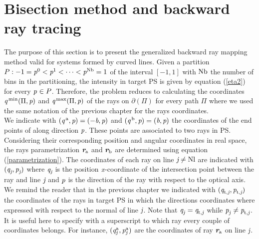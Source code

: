 \section{Bisection method and backward ray tracing}\label{sec:raymapping_explanation}
The purpose of this section is to present the generalized backward ray mapping method valid for systems formed by curved lines. 
Given a partition $P: -1 = \textit{p}^0<\textit{p}^1<\cdots<\textit{p}^{\textrm{Nb}}=1$ of the interval $[-1,1]$ with $\textrm{Nb}$ the number of bins in the partitioning, the intensity in target PS is given by equation (\ref{eta2}) for every $\textit{p}_{\textrm{} \textit{}}\in P$.
Therefore, the problem reduces to calculating the coordinates 
$\textit{q}^{\textrm{\,min}}(\Pi, \textit{p})$ and $\textit{q}^{\textrm{\,max}}(\Pi, \textit{p})$ of the rays on $\partial$$(\Pi)$ for every path $\Pi$ where we used the same notation of the previous chapter for the rays coordinates.
\\ \indent 
We indicate with $(\textit{q}^{\,\textrm{a}}, \textit{p})= (-\textit{b}, \textit{p})$ and $(\textit{q}^{\,\textrm{b}}, \textit{p}) = (\textit{b}, \textit{p})$ the coordinates of the end points of  along direction $\textit{p}$. These points are associated to two rays in PS. Considering their corresponding position and angular coordinates in real space, the rays parametrization $\textit{\textbf{r}}_{\textrm{a}}$ and $\textit{\textbf{r}}_{\textrm{b}}$ are determined using equation (\ref{parametrization}).
The coordinates of each ray on line $\textit{j}\neq \textrm{Nl}$ are indicated with $(\textit{q}_{\textit{j}}, \textit{p}_{\textit{j}})$ where $\textit{q}_{\textit{j}}$ is the position $\textit{x}$-coordinate of the intersection point between the ray and line $\textit{j}$ and $\textit{p}$ is the direction of the ray with respect to the optical axis. 
We remind the reader that in the previous chapter we indicated with $(\textit{q}_{\textrm{t,} \textit{\textit{j}}},\textit{p}_{\textrm{t,} \textit{\textit{j}}})$ the coordinates of the rays in target PS  in which the directions coordinates where expressed with respect to the normal of line $\textit{j}$. Note that $\textit{q}_{\textrm{\textit{j}} \textit{}}=\textit{q}_{\textrm{t,} \textit{\textit{j}}}$ while $\textit{p}_{\textrm{\textit{j}} \textit{}}\neq\textit{p}_{\textrm{t,} \textit{\textit{j}}}$. It is useful here to specify with a superscript to which ray every couple of coordinates belongs. For instance, $(\textit{q}_{\textrm{\textit{j}} \textit{}}^{\textrm{a}}, \textit{p}_{\textrm{\textit{j}} \textit{}}^{\textrm{a}})$ are the coordinates of ray $\textit{\textbf{r}}_{\textrm{a}}$ on line $\textit{j}$.\\ \indent 
